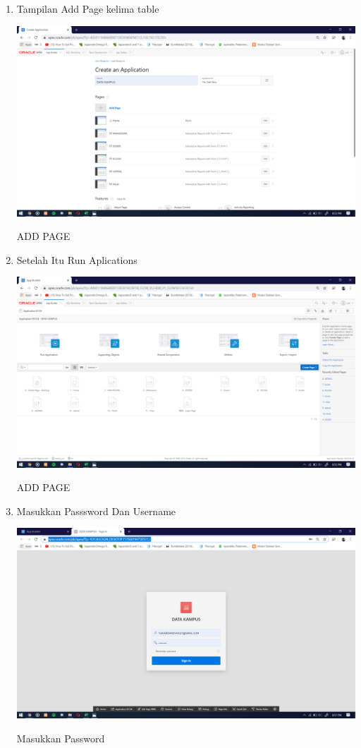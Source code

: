 \documentclass{article}
\begin{document}
\begin{enumerate}
     \item Tampilan Add Page kelima table
    \begin{center}
         \centering
            \includegraphics[scale=0.27]{figures/DB12.png}
        \caption{ADD PAGE}
        \label{excel}
    \end{center}
    
    \item Setelah Itu Run Aplications
    \begin{center}
         \centering
            \includegraphics[scale=0.27]{figures/DB13.png}
        \caption{ADD PAGE}
        \label{excel}
    \end{center}
    
    \item Masukkan Passsword Dan Username
    \begin{center}
         \centering
            \includegraphics[scale=0.27]{figures/DB14.png}
        \caption{Masukkan Password}
        \label{excel}
    \end{center}
    

\end{enumerate}
\end{document}
